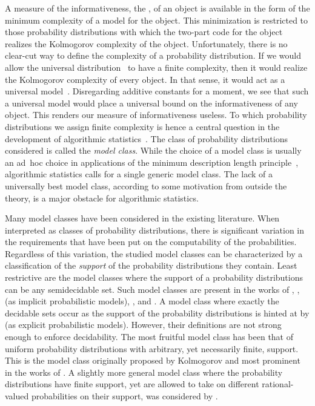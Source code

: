A measure of the informativeness, the , of an object is available in the form of the minimum complexity of a model for the object.
This minimization is restricted to those probability distributions with which the two-part code for the object realizes the Kolmogorov complexity of the object.
Unfortunately, there is no clear-cut way to define the complexity of a probability distribution.
If we would allow the universal distribution~\parencite{li2008introduction} to have a finite complexity, then it would realize the Kolmogorov complexity of every object.
In that sense, it would act as a universal model~\parencite{vitanyi2006meaningful,bloem2015two}.
Disregarding additive constants for a moment, we see that such a universal model would place a universal bound on the informativeness of any object.
This renders our measure of informativeness useless.
To which probability distributions we assign finite complexity is hence a central question in the development of algorithmic statistics~\parencite{vereshchagin2017algorithmic}.
The class of probability distributions considered is called the \emph{model class}.
While the choice of a model class is usually an ad~hoc choice in applications of the minimum description length principle~\parencite{vitanyi2000minimum,grunwald2007minimum}, algorithmic statistics calls for a single generic model class.
The lack of a universally best model class, according to some motivation from outside the theory, is a major obstacle for algorithmic statistics.

Many model classes have been considered in the existing literature.
When interpreted as classes of probability distributions, there is significant variation in the requirements that have been put on the computability of the probabilities.
Regardless of this variation, the studied model classes can be characterized by a classification of the \emph{support} of the probability distributions they contain.
Least restrictive are the model classes where the support of a probability distributions can be any semidecidable set.
Such model classes are present in the works of \textcite{rissanen1983universal}, \textcite{koppel1988structure}, \textcite{gacs2001algorithmic} (as implicit probabilistic models), \textcite{vitanyi2006meaningful}, and \textcite{antunes2009sophistication}.
A model class where exactly the decidable sets occur as the support of the probability distributions is hinted at by \textcite{gacs2001algorithmic} (as explicit probabilistic models).
However, their definitions are not strong enough to enforce decidability.
The most fruitful model class has been that of uniform probability distributions with arbitrary, yet necessarily finite, support.
This is the model class originally proposed by Kolmogorov and most prominent in the works of \textcite{gacs2001algorithmic,vereshchagin2004kolmogorov}.
A slightly more general model class where the probability distributions have finite support, yet are allowed to take on different rational-valued probabilities on their support, was considered by \textcite{vereshchagin2017algorithmic}.

